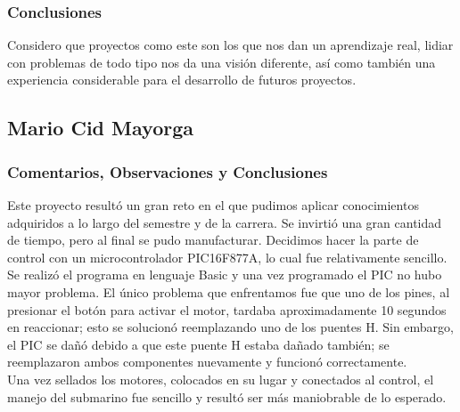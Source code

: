 \subsubsection{Conclusiones}
Considero que proyectos como este son los que nos dan un aprendizaje real, lidiar con problemas de todo tipo nos da una
visi\'on diferente, as\'i como tambi\'en una experiencia considerable para el desarrollo de futuros proyectos.

\subsection{Mario Cid Mayorga}
\subsubsection{Comentarios, Observaciones y Conclusiones}
Este proyecto result\'o un gran reto en el que pudimos aplicar conocimientos adquiridos a lo largo del semestre y
de la carrera. Se invirti\'o una gran cantidad de tiempo, pero al final se pudo manufacturar. Decidimos hacer la
parte de control con un microcontrolador PIC16F877A, lo cual fue relativamente sencillo. \\

Se realiz\'o el programa en lenguaje Basic y una vez programado el PIC no hubo mayor problema. El \'unico problema
que enfrentamos fue que uno de los pines, al presionar el bot\'on para activar el motor, tardaba aproximadamente
10 segundos en reaccionar; esto se solucion\'o reemplazando uno de los puentes H.
Sin embargo, el PIC se da\~n\'o debido a que este puente H estaba da\~nado tambi\'en; se reemplazaron ambos
componentes nuevamente y funcion\'o correctamente.\\

Una vez sellados los motores, colocados en su lugar y conectados al control, el manejo del submarino fue sencillo y
result\'o ser m\'as maniobrable de lo esperado.
